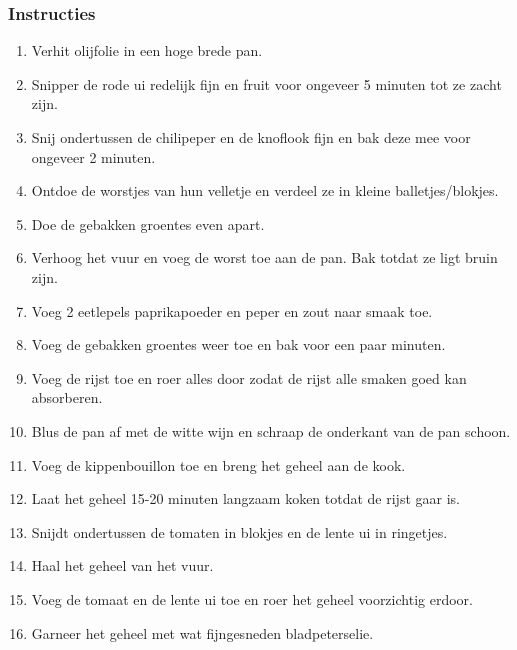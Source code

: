 \subsubsection*{Instructies}
\begin{multicols}{2}
    \begin{enumerate}
        \item Verhit olijfolie in een hoge brede pan.
        \item Snipper de rode ui redelijk fijn en fruit voor ongeveer 5 minuten tot ze zacht zijn.
        \item Snij ondertussen de chilipeper en de knoflook fijn en bak deze mee voor ongeveer 2 minuten.
        \item Ontdoe de worstjes van hun velletje en verdeel ze in kleine balletjes/blokjes.
        \item Doe de gebakken groentes even apart.
        \item Verhoog het vuur en voeg de worst toe aan de pan. Bak totdat ze ligt bruin zijn.
        \item Voeg 2 eetlepels paprikapoeder en peper en zout naar smaak toe.
        \item Voeg de gebakken groentes weer toe en bak voor een paar minuten.
        \item Voeg de rijst toe en roer alles door zodat de rijst alle smaken goed kan absorberen.
        \item Blus de pan af met de witte wijn en schraap de onderkant van de pan schoon.
        \item Voeg de kippenbouillon toe en breng het geheel aan de kook.
        \item Laat het geheel 15-20 minuten langzaam koken totdat de rijst gaar is.
        \item Snijdt ondertussen de tomaten in blokjes en de lente ui in ringetjes.
        \item Haal het geheel van het vuur.
        \item Voeg de tomaat en de lente ui toe en roer het geheel voorzichtig erdoor.
        \item Garneer het geheel met wat \break fijngesneden bladpeterselie.
    \end{enumerate}
\end{multicols}